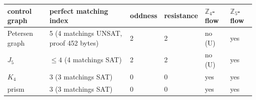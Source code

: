 \begin{tabular}{llllll}
\toprule
control graph & perfect matching index & oddness & resistance & $\mathbb Z_4$-flow & $\mathbb Z_5$-flow\\
\midrule
Petersen graph & 5 (4 matchings UNSAT, proof 452 bytes) & 2 & 2 & no (U) & yes\\
$J_5$ & $\le4$ (4 matchings SAT) & 2 & 2 & no (U) & yes\\
$K_4$ & 3 (3 matchings SAT) & 0 & 0 & yes & yes\\
prism & 3 (3 matchings SAT) & 0 & 0 & yes & yes\\
\bottomrule
\end{tabular}
